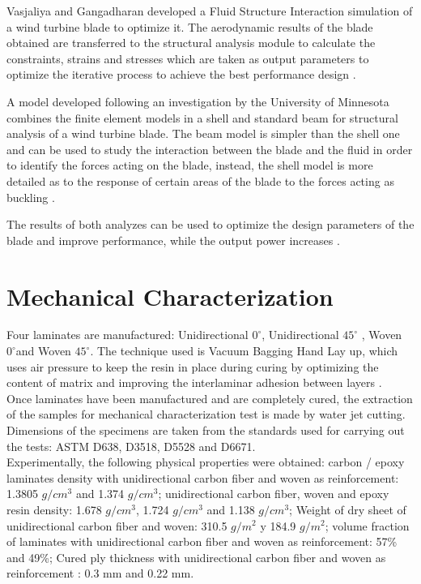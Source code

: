 Vasjaliya and Gangadharan developed a Fluid Structure Interaction simulation of a wind turbine blade to optimize it. The aerodynamic results of the blade obtained are transferred to the structural analysis module to calculate the constraints, strains and stresses which are taken as output parameters to optimize the iterative process to achieve the best performance design \cite{vas}.

A model developed following an investigation by the University of Minnesota combines the finite element models in a shell and standard beam for structural analysis of a wind turbine blade. The beam model is simpler than the shell one and can be used to study the interaction between the blade and the fluid in order to identify the forces acting on the blade, instead, the shell model is more detailed as to the response of certain areas of the blade to the forces acting as buckling \cite{dong}.

The results of both analyzes can be used to optimize the design parameters of the blade and improve performance, while the output power  increases \cite{dahl}.
\vspace{-0.6cm}
\section{Mechanical Characterization}
\label{sec:3}
Four laminates are manufactured: Unidirectional $0^\circ$, Unidirectional $45^\circ$ , Woven $0^\circ$and Woven $45^\circ$. The technique used is Vacuum Bagging Hand Lay up, which uses air pressure to keep the resin in place during curing by optimizing the content of matrix and improving the interlaminar adhesion between layers \cite{west}.\\ 

Once laminates have been manufactured and are completely cured, the extraction of the samples for mechanical characterization test is made by water jet cutting. Dimensions of the specimens are taken from the standards used for carrying out the tests: ASTM D638, D3518, D5528 and D6671.\\

Experimentally, the following physical properties were obtained: carbon / epoxy laminates density with unidirectional carbon fiber and woven as reinforcement: 1.3805 $g/cm^3$ and 1.374 $g/cm^3$; unidirectional carbon fiber, woven and epoxy resin density: 1.678 $g/cm^3$, 1.724 $g/cm^3$ and 1.138 $g/cm^3$; Weight of dry sheet of unidirectional carbon fiber and woven: 310.5 $g/m^2$ y 184.9 $g/m^2$; volume fraction of laminates with unidirectional carbon fiber and woven as reinforcement: 57{\%} and 49{\%}; Cured ply thickness with unidirectional carbon fiber and woven as reinforcement : 0.3 mm and 0.22 mm.\\

